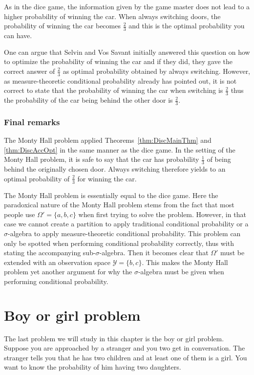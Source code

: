 \documentclass[a4paper]{report}
\theoremstyle{plain}
\theoremstyle{definition}
\theoremstyle{remark}
\numberwithin{equation}{chapter}
\DeclareMathOperator{\1}{\mathbbm{1}}
\newcommand{\Y}{\mathcal{Y}}
\begin{document}
As in the dice game, the information given by the game master does not lead to a higher probability of winning the car. When always switching doors, the probability of winning the car becomes $\frac{2}{3}$ and this is the optimal probability you can have.

One can argue that Selvin and Vos Savant \cite{Selvin75a,Marilyn90a} initially answered this question on how to optimize the probability of winning the car and if they did, they gave the correct answer of $\frac{2}{3}$ as optimal probability obtained by always switching. However, as measure-theoretic conditional probability already has pointed out, it is not correct to state that the probability of winning the car when switching is $\frac{2}{3}$ thus the probability of the car being behind the other door is $\frac{2}{3}$.

\subsubsection{Final remarks}
The Monty Hall problem applied Theorems~\ref{thm:DiscMainThm} and \ref{thm:DiscAccOpt} in the same manner as the dice game. In the setting of the Monty Hall problem, it is safe to say that the car has probability $\frac{1}{3}$ of being behind the originally chosen door. Always switching therefore yields to an optimal probability of $\frac{2}{3}$ for winning the car.

The Monty Hall problem is essentially equal to the dice game. Here the paradoxical nature of the Monty Hall problem stems from the fact that most people use $\Omega'=\{a,b,c\}$ when first trying to solve the problem. However, in that case we cannot create a partition to apply traditional conditional probability or a $\sigma$-algebra to apply measure-theoretic conditional probability. This problem can only be spotted when performing conditional probability correctly, thus with stating the accompanying sub-$\sigma$-algebra. Then it becomes clear that $\Omega'$ must be extended with an observation space $\Y=\{b,c\}$. This makes the Monty Hall problem yet another argument for why the $\sigma$-algebra must be given when performing conditional probability.

\section{Boy or girl problem}\label{sec:DiscChildren}
The last problem we will study in this chapter is the boy or girl problem. Suppose you are approached by a stranger and you two get in conversation. The stranger tells you that he has two children and at least one of them is a girl. You want to know the probability of him having two daughters.
\end{document}
